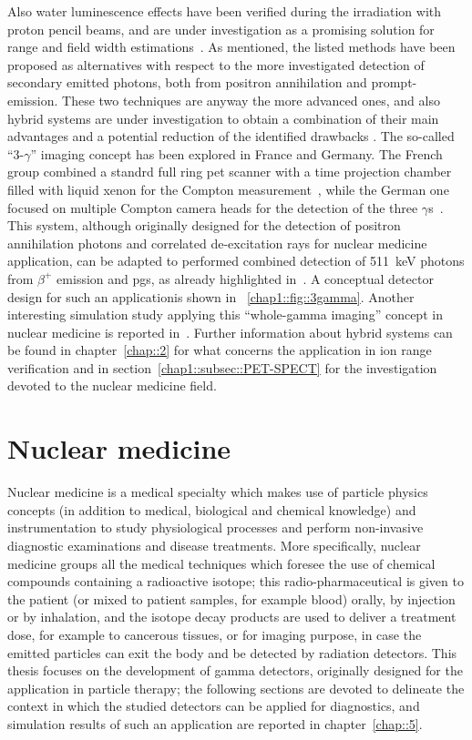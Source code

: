 Also water luminescence effects have been verified during the irradiation  with proton pencil beams, and are under investigation as a promising solution for range and field width estimations~\parencite{Komori2018}.   
As mentioned, the listed methods have been proposed as alternatives with respect to the more investigated detection of secondary emitted photons, both from positron annihilation and prompt-emission. These two techniques are anyway the more advanced ones, and also hybrid systems are under investigation to obtain a combination of their main advantages and a potential reduction of the identified drawbacks .  
The so-called \enquote{3-$\gamma$} imaging concept has been explored in France and Germany. The French group combined a standrd full ring \gls{pet} scanner with a time projection chamber filled with liquid xenon for the Compton measurement~\parencite{Oger2012}, while the German one focused on multiple Compton camera heads for the detection of the three $\gamma$s~\parencite{Lang2014}. This system, although originally designed for the detection of positron annihilation photons and correlated de-excitation rays for nuclear medicine application, can be adapted to performed combined detection of 511~keV photons from $\beta^+$ emission and \glspl{pg}, as already highlighted in~\parencite{Lang2014}. A conceptual detector design for such an applicationis shown in \figurename~\ref{chap1::fig::3gamma}. Another interesting simulation study applying this \enquote{whole-gamma imaging} concept in nuclear medicine is reported in~\parencite{Yamaya2017b}. 
 Further information about hybrid systems can be found in chapter~\ref{chap::2} for what concerns the application in ion range verification and in section~\ref{chap1::subsec::PET-SPECT} for the investigation devoted to the nuclear medicine field.

\newpage

\section{Nuclear medicine}\label{chap1::sec::NuclearMed}

Nuclear medicine is a medical specialty which makes use of particle physics concepts (in addition to medical, biological and chemical knowledge) and instrumentation to study physiological processes and perform non-invasive diagnostic examinations and disease treatments. More specifically, nuclear medicine groups all the medical techniques which foresee the use of chemical compounds containing a radioactive isotope; this radio-pharmaceutical is given to the patient (or mixed to patient samples, for example blood) orally, by injection or by inhalation, and the isotope decay products are used to deliver a treatment dose, for example to cancerous tissues, or for imaging purpose, in case the emitted particles can exit the body and be detected by radiation detectors. 
This thesis focuses on the development of gamma detectors, originally designed for the application in particle therapy; the following sections are devoted to delineate the context in which the studied detectors can be applied for diagnostics, and simulation results of such an application are reported in chapter~\ref{chap::5}.

